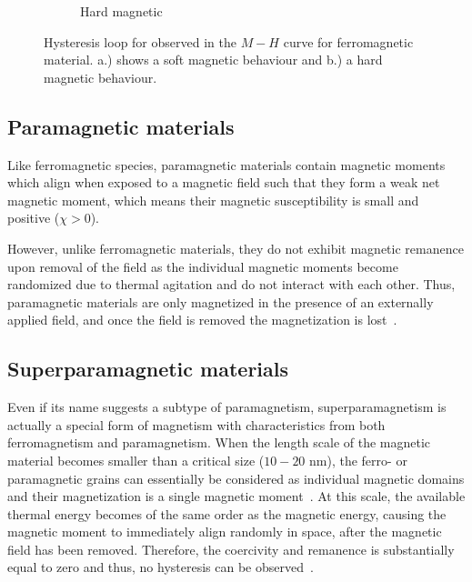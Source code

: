 \begin{figure}[htb]
\begin{subfigure}[b]{0.48\textwidth}
                \caption{Hard magnetic}
                \label{fig:magneticHard}
        \end{subfigure}
        \caption[Hysteresis loops for soft and hard magnetic materials]{Hysteresis loop for observed in the $M-H$ curve for ferromagnetic material. a.) shows a soft magnetic behaviour and b.) a hard magnetic behaviour.}
        \label{fig:magneticSoftMagneticHard}
\end{figure}

\subsection{Paramagnetic materials}\label{subsec:paramagneticMaterials}
Like ferromagnetic species, paramagnetic materials contain magnetic moments which align when exposed to a magnetic field such that they form a weak net magnetic moment, which means their magnetic susceptibility is small and positive ($\chi > 0$). 

However, unlike ferromagnetic materials, they do not exhibit magnetic remanence upon removal of the field as the individual magnetic moments become randomized due to thermal agitation and do not interact with each other. Thus, paramagnetic materials are only magnetized in the presence of an externally applied field, and once the field is removed the magnetization is lost~\cite{Chikazumi1964,Coey2010}.

\subsection{Superparamagnetic materials}\label{subsec:superparamagneticMaterials}
Even if its name suggests a subtype of paramagnetism, superparamagnetism is actually a special form of magnetism with characteristics from both ferromagnetism and paramagnetism. When the length scale of the magnetic material becomes smaller than a critical size ($10-20$ nm), the ferro- or paramagnetic grains can essentially be considered as individual magnetic domains and their magnetization is a single magnetic moment~\cite{Ohandley2000}. At this scale, the available thermal energy becomes of the same order as the magnetic energy, causing the magnetic moment to immediately align randomly in space, after the magnetic field has been removed. Therefore, the coercivity and remanence is substantially equal to zero and thus, no hysteresis can be observed~\cite{Brown1963,McNab1968,Rosensweig2013}. 
 
